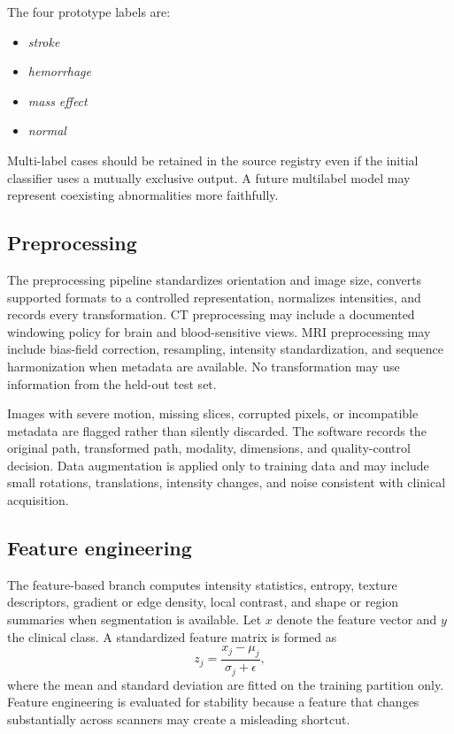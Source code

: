 \documentclass[10pt,a4paper]{article}
\begin{document}
The four prototype labels are:
\begin{itemize}[leftmargin=*,nosep]
\item \emph{stroke}
\item \emph{hemorrhage}
\item \emph{mass effect}
\item \emph{normal}
\end{itemize}
Multi-label cases should be retained in the source registry even if the initial classifier uses a mutually exclusive output. A future multilabel model may represent coexisting abnormalities more faithfully.

\subsection{Preprocessing}
The preprocessing pipeline standardizes orientation and image size, converts supported formats to a controlled representation, normalizes intensities, and records every transformation. CT preprocessing may include a documented windowing policy for brain and blood-sensitive views. MRI preprocessing may include bias-field correction, resampling, intensity standardization, and sequence harmonization when metadata are available. No transformation may use information from the held-out test set.

Images with severe motion, missing slices, corrupted pixels, or incompatible metadata are flagged rather than silently discarded. The software records the original path, transformed path, modality, dimensions, and quality-control decision. Data augmentation is applied only to training data and may include small rotations, translations, intensity changes, and noise consistent with clinical acquisition.

\subsection{Feature engineering}
The feature-based branch computes intensity statistics, entropy, texture descriptors, gradient or edge density, local contrast, and shape or region summaries when segmentation is available. Let $x$ denote the feature vector and $y$ the clinical class. A standardized feature matrix is formed as
\begin{equation}
z_j = \frac{x_j-\mu_j}{\sigma_j+\epsilon},
\end{equation}
where the mean and standard deviation are fitted on the training partition only. Feature engineering is evaluated for stability because a feature that changes substantially across scanners may create a misleading shortcut.
\end{document}
